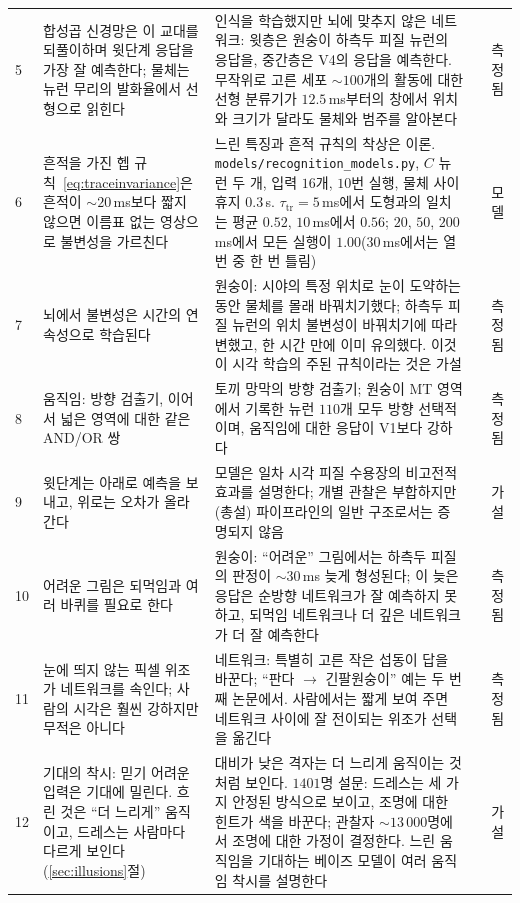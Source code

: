 {\begin{longtable}{>{\raggedright}p{0.5cm}>{\raggedright}p{4.0cm}>{\raggedright}p{5.6cm}>{\raggedright}p{2.3cm}>{\raggedright\arraybackslash}p{1.7cm}}
5 & 합성곱 신경망은 이 교대를 되풀이하며 윗단계 응답을 가장 잘 예측한다; 물체는 뉴런 무리의 발화율에서 선형으로 읽힌다 & 인식을 학습했지만 뇌에 맞추지 않은 네트워크: 윗층은 원숭이 하측두 피질 뉴런의 응답을, 중간층은 V4의 응답을 예측한다. 무작위로 고른 세포 $\sim100$개의 활동에 대한 선형 분류기가 $12.5$\,ms부터의 창에서 위치와 크기가 달라도 물체와 범주를 알아본다 & \cite{Fukushima1980,Yamins2014,Hung2005} & 측정됨 \\
6 & 흔적을 가진 헵 규칙~\eqref{eq:traceinvariance}은 흔적이 $\sim20$\,ms보다 짧지 않으면 이름표 없는 영상으로 불변성을 가르친다 & 느린 특징과 흔적 규칙의 착상은 이론. \texttt{models/\allowbreak recognition\_models.py}, $C$ 뉴런 두 개, 입력 $16$개, $10$번 실행, 물체 사이 휴지 $0.3$\,s. $\tau_{\text{tr}}=5$\,ms에서 도형과의 일치는 평균 $0.52$, $10$\,ms에서 $0.56$; $20$, $50$, $200$\,ms에서 모든 실행이 $1.00$($30$\,ms에서는 열 번 중 한 번 틀림) & \cite{Foldiak1991,WiskottSejnowski2002} & 모델 \\
7 & 뇌에서 불변성은 시간의 연속성으로 학습된다 & 원숭이: 시야의 특정 위치로 눈이 도약하는 동안 물체를 몰래 바꿔치기했다; 하측두 피질 뉴런의 위치 불변성이 바꿔치기에 따라 변했고, 한 시간 만에 이미 유의했다. 이것이 시각 학습의 주된 규칙이라는 것은 가설 & \cite{LiDiCarlo2008} & 측정됨 \\
8 & 움직임: 방향 검출기, 이어서 넓은 영역에 대한 같은 AND/OR 쌍 & 토끼 망막의 방향 검출기; 원숭이 MT 영역에서 기록한 뉴런 $110$개 모두 방향 선택적이며, 움직임에 대한 응답이 V1보다 강하다 & \cite{Barlow1965,Albright1984} & 측정됨 \\
9 & 윗단계는 아래로 예측을 보내고, 위로는 오차가 올라간다 & 모델은 일차 시각 피질 수용장의 비고전적 효과를 설명한다; 개별 관찰은 부합하지만(총설) 파이프라인의 일반 구조로서는 증명되지 않음 & \cite{RaoBallard1999,Keller2018} & 가설 \\
10 & 어려운 그림은 되먹임과 여러 바퀴를 필요로 한다 & 원숭이: “어려운” 그림에서는 하측두 피질의 판정이 $\sim30$\,ms 늦게 형성된다; 이 늦은 응답은 순방향 네트워크가 잘 예측하지 못하고, 되먹임 네트워크나 더 깊은 네트워크가 더 잘 예측한다 & \cite{Kar2019} & 측정됨 \\
11 & 눈에 띄지 않는 픽셀 위조가 네트워크를 속인다; 사람의 시각은 훨씬 강하지만 무적은 아니다 & 네트워크: 특별히 고른 작은 섭동이 답을 바꾼다; “판다 $\to$ 긴팔원숭이” 예는 두 번째 논문에서. 사람에서는 짧게 보여 주면 네트워크 사이에 잘 전이되는 위조가 선택을 옮긴다 & \cite{Szegedy2014,Goodfellow2015,Elsayed2018} & 측정됨 \\
12 & 기대의 착시: 믿기 어려운 입력은 기대에 밀린다. 흐린 것은 “더 느리게” 움직이고, 드레스는 사람마다 다르게 보인다(\ref{sec:illusions}절) & 대비가 낮은 격자는 더 느리게 움직이는 것처럼 보인다. $1401$명 설문: 드레스는 세 가지 안정된 방식으로 보이고, 조명에 대한 힌트가 색을 바꾼다; 관찰자 $\sim13\,000$명에서 조명에 대한 가정이 결정한다. 느린 움직임을 기대하는 베이즈 모델이 여러 움직임 착시를 설명한다 & \cite{Thompson1982,LaferSousa2015,Wallisch2017,Weiss2002,Purves2011} & 가설 \\

\end{longtable}}
